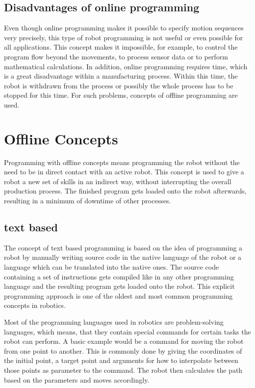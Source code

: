 \documentclass[conference]{IEEEtran}
\begin{document}
    \subsection{Disadvantages of online programming}
    Even though online programming makes it possible to specify motion sequences very precisely, this type of robot programming is not useful or even possible for all applications. This concept makes it impossible, for example, to control the program flow beyond the movements, to process sensor data or to perform mathematical calculations. In addition, online programming requires time, which is a great disadvantage within a manufacturing process. Within this time, the robot is withdrawn from the process or possibly the whole process has to be stopped for this time. For such problems, concepts of offline programming are used. %

\section{Offline Concepts}

    Programming with offline concepts means programming the robot without the need to be in direct contact with an active robot. This concept is used to give a robot a new set of skills in an indirect way, without interrupting the overall production process.
    The finished program gets loaded onto the robot afterwards, resulting in a minimum of downtime of other processes. \cite[p. 186]{b4}

    \subsection{text based}

        The concept of text based programming is based on the idea of programming a robot by manually writing source code in the native language of the robot or a language which can be translated into the native ones. The source code containing a set of instructions gets compiled like in any other programming language and the resulting program gets loaded onto the robot. %
        This explicit programming approach is one of the oldest and most common programming concepts in robotics. %

        Most of the programming languages used in robotics are problem-solving languages, which means, that they contain special commands for certain tasks the robot can perform. A basic example would be a command for moving the robot from one point to another. This is commonly done by giving the coordinates of the initial point, a target point and arguments for how to interpolate between those points as parameter to the command. 
        The robot then calculates the path based on the parameters and moves accordingly. %
               
\end{document}
